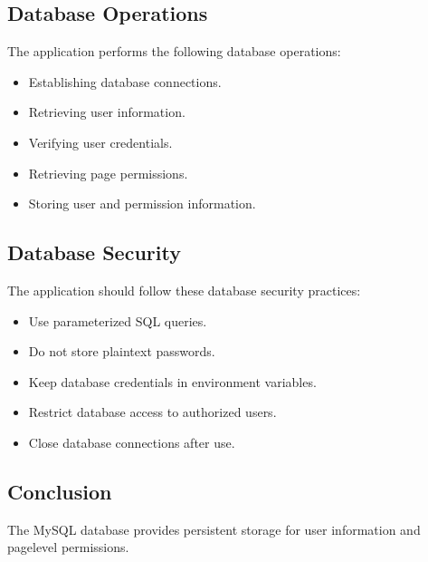 \documentclass[letterpaper,10pt,english]{sphinxmanual}
\begin{document}
\subsection{Database Operations}
\label{\detokenize{database:database-operations}}
\sphinxAtStartPar
The application performs the following database operations:
\begin{itemize}
\item {} 
\sphinxAtStartPar
Establishing database connections.

\item {} 
\sphinxAtStartPar
Retrieving user information.

\item {} 
\sphinxAtStartPar
Verifying user credentials.

\item {} 
\sphinxAtStartPar
Retrieving page permissions.

\item {} 
\sphinxAtStartPar
Storing user and permission information.

\end{itemize}


\subsection{Database Security}
\label{\detokenize{database:database-security}}
\sphinxAtStartPar
The application should follow these database security practices:
\begin{itemize}
\item {} 
\sphinxAtStartPar
Use parameterized SQL queries.

\item {} 
\sphinxAtStartPar
Do not store plain\sphinxhyphen{}text passwords.

\item {} 
\sphinxAtStartPar
Keep database credentials in environment variables.

\item {} 
\sphinxAtStartPar
Restrict database access to authorized users.

\item {} 
\sphinxAtStartPar
Close database connections after use.

\end{itemize}


\subsection{Conclusion}
\label{\detokenize{database:conclusion}}
\sphinxAtStartPar
The MySQL database provides persistent storage for user information and
page\sphinxhyphen{}level permissions.
\end{document}
